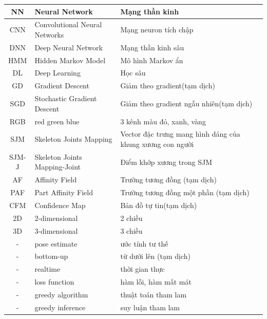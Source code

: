 \newpage
\thispagestyle{danhmucviettat}
{}



\FloatBarrier
\begin{table}[h]
\label{table:tu_viet_tat}
\centering
\begin{center}
\begin{tabular}{|c|l|p{7cm}|} 
\hline 
NN & Neural Network & Mạng thần kinh\\ 
\hline
CNN & Convolutional Neural Networks & Mạng neuron tích chập\\
\hline 
DNN & Deep Neural Network & Mạng thần kinh sâu\\
\hline
HMM & Hidden Markov Model & Mô hình Markov ẩn \\
\hline 
DL & Deep Learning & Học sâu\\
\hline
GD & Gradient Descent & Giảm theo gradient(tạm dịch)\\
\hline
SGD & Stochastic Gradient Descent & Giảm theo gradient ngẫu nhiên(tạm dịch)\\
\hline
RGB & red green blue & 3 kênh màu đỏ, xanh, vàng \\
\hline
SJM & Skeleton Joints Mapping & Vector đặc trưng mang hình dáng của khung xương con người\\
\hline
SJM-J & Skeleton Joints Mapping-Joint & Điểm khớp xương trong SJM\\
\hline
AF & Affinity Field &  Trường tương đồng (tạm dịch)\\
\hline
PAF & Part Affinity Field &  Trường tương đồng một phần (tạm dịch)\\
\hline
CFM & Confidence Map & Bản đồ tự tin(tạm dịch)\\
\hline
2D & 2-dimensional & 2 chiều \\
\hline
3D & 3-dimensional & 3 chiều \\
\hline
- & pose estimate & ước tính tư thế \\
\hline
- & bottom-up & từ dưới lên (tạm dịch) \\
\hline
- & realtime & thời gian thực \\
\hline
- & loss function & hàm lỗi, hàm mất mát \\
\hline
- & greedy algorithm & thuật toán tham lam \\
\hline
- & greedy inference & suy luận tham lam \\
\hline
\end{tabular}
\end{center}
\end{table}
\FloatBarrier
 
\newpage